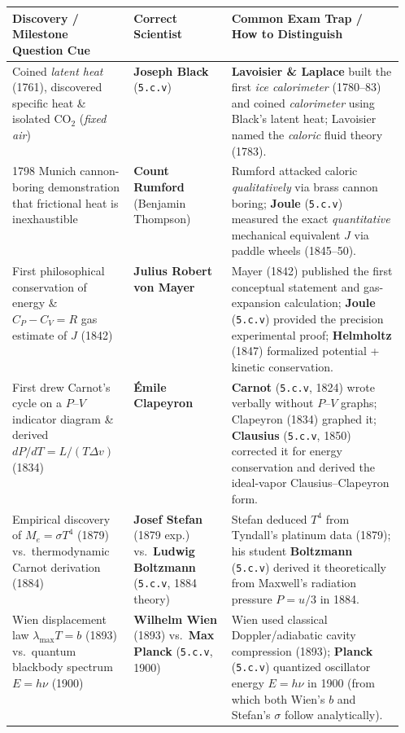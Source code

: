\begin{center}
\label{tab:03:historytraps}
\footnotesize\setlength{\tabcolsep}{3.5pt}\renewcommand{\arraystretch}{1.13}
\begin{tabularx}{\linewidth}{@{}p{0.31\linewidth} p{0.25\linewidth} X@{}}\toprule
\textbf{Discovery / Milestone Question Cue} & \textbf{Correct Scientist} & \textbf{Common Exam Trap / How to Distinguish} \\\midrule
Coined \emph{latent heat} (1761), discovered specific heat \& isolated $\mathrm{CO_2}$ (\emph{fixed air}) & \textbf{Joseph Black} (\texttt{5.c.v}) & \textbf{Lavoisier \& Laplace} built the first \emph{ice calorimeter} (1780--83) and coined \emph{calorimeter} using Black's latent heat; Lavoisier named the \emph{caloric} fluid theory (1783). \\
1798 Munich cannon-boring demonstration that frictional heat is inexhaustible & \textbf{Count Rumford} (Benjamin Thompson) & Rumford attacked caloric \emph{qualitatively} via brass cannon boring; \textbf{Joule} (\texttt{5.c.v}) measured the exact \emph{quantitative} mechanical equivalent $J$ via paddle wheels (1845--50). \\
First philosophical conservation of energy \& $C_P - C_V = R$ gas estimate of $J$ (1842) & \textbf{Julius Robert von Mayer} & Mayer (1842) published the first conceptual statement and gas-expansion calculation; \textbf{Joule} (\texttt{5.c.v}) provided the precision experimental proof; \textbf{Helmholtz} (1847) formalized potential + kinetic conservation. \\
First drew Carnot's cycle on a $P$--$V$ indicator diagram \& derived $dP/dT = L/(T\Delta v)$ (1834) & \textbf{\'Emile Clapeyron} & \textbf{Carnot} (\texttt{5.c.v}, 1824) wrote verbally without $P$--$V$ graphs; Clapeyron (1834) graphed it; \textbf{Clausius} (\texttt{5.c.v}, 1850) corrected it for energy conservation and derived the ideal-vapor Clausius--Clapeyron form. \\
Empirical discovery of $M_e = \sigma T^4$ (1879) vs.\ thermodynamic Carnot derivation (1884) & \textbf{Josef Stefan} (1879 exp.) vs.\ \textbf{Ludwig Boltzmann} (\texttt{5.c.v}, 1884 theory) & Stefan deduced $T^4$ from Tyndall's platinum data (1879); his student \textbf{Boltzmann} (\texttt{5.c.v}) derived it theoretically from Maxwell's radiation pressure $P = u/3$ in 1884. \\
Wien displacement law $\lambda_{\max}T = b$ (1893) vs.\ quantum blackbody spectrum $E = h\nu$ (1900) & \textbf{Wilhelm Wien} (1893) vs.\ \textbf{Max Planck} (\texttt{5.c.v}, 1900) & Wien used classical Doppler/adiabatic cavity compression (1893); \textbf{Planck} (\texttt{5.c.v}) quantized oscillator energy $E=h\nu$ in 1900 (from which both Wien's $b$ and Stefan's $\sigma$ follow analytically). \\

\end{tabularx}
\end{center}

